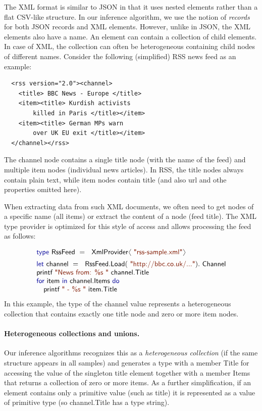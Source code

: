 \documentclass[preprint]{sigplanconf}
\newcommand{\langl}{\begin{picture}(4.5,7)
\put(1.1,2.5){\rotatebox{60}{\line(1,0){5.5}}}
\put(1.1,2.5){\rotatebox{300}{\line(1,0){5.5}}}
\end{picture}}
\newcommand{\rangl}{\begin{picture}(4.5,7)
\put(.9,2.5){\rotatebox{120}{\line(1,0){5.5}}}
\put(.9,2.5){\rotatebox{240}{\line(1,0){5.5}}}
\end{picture}}
\newcommand{\kvd}[1]{\textnormal{\textcolor{kvdclr}{\sffamily #1}}}
\newcommand{\str}[1]{\textnormal{\textcolor{strclr}{\sffamily "#1"}}}
\newcommand{\ident}[1]{\textnormal{\sffamily #1}}
\begin{document}
The XML format is similar to JSON in that it uses nested elements rather than a flat CSV-like 
structure. In our inference algorithm, we use the notion of \emph{records} for both JSON records 
and XML elements. However, unlike in JSON, the XML elements also have a name. An element can 
contain a collection of child elements. In case of XML, the collection can often be heterogeneous 
containing child nodes of different names. Consider the following (simplified) RSS news feed as an example:
%
{\small{
\begin{verbatim}
  <rss version="2.0"><channel>
    <title> BBC News - Europe </title>
    <item><title> Kurdish activists 
        killed in Paris </title></item>
    <item><title> German MPs warn 
        over UK EU exit </title></item>
  </channel></rss>
\end{verbatim}
}}
%
\noindent
The \ident{channel} node contains a single \ident{title} node (with the name of the feed) and multiple 
\ident{item} nodes (individual news articles). In RSS, the \ident{title} nodes always contain plain text,
while \ident{item} nodes contain \ident{title} (and also \ident{url} and othe properties omitted here).

When extracting data from such XML documents, we often need to get nodes of a specific name (all
items) or extract the content of a node (feed title). The XML type provider is optimized for 
this style of access and allows processing the feed as follows:

\noindent
\begin{equation*}
\begin{array}{l}
 \kvd{type}~\ident{RssFeed}~=~\ident{XmlProvider}\langl\str{rss-sample.xml}\rangl\hspace{1em} \\[0.5em]
 \kvd{let}~\ident{channel}~=~\ident{RssFeed.Load}(\str{http://bbc.co.uk/...}).\ident{Channel}\\
 \ident{printf}~\str{News from: \%s }~\ident{channel.Title}\\
 \kvd{for}~\ident{item}~\kvd{in}~\ident{channel.Items}~\kvd{do}\\
 \quad\ident{printf}~\str{ - \%s }~\ident{item.Title}\\
\end{array}
\end{equation*}
%
In this example, the type of the \ident{channel} value represents a heterogeneous collection
that contains exactly one \ident{title} node and zero or more \ident{item} nodes.

\paragraph{Heterogeneous collections and unions.}
Our inference algorithms recognizes this as a \emph{heterogeneous collection} (if the same structure 
appears in all samples) and generates a type with a member \ident{Title} for accessing the value 
of the singleton \ident{title} element together with a member \ident{Items} that returns a 
collection of zero or more items. As a further simplification, if an element contains only a 
primitive value (such as \ident{title}) it is represented as a value of primitive type (so 
\ident{channel.Title} has a type \ident{string}).
\end{document}
